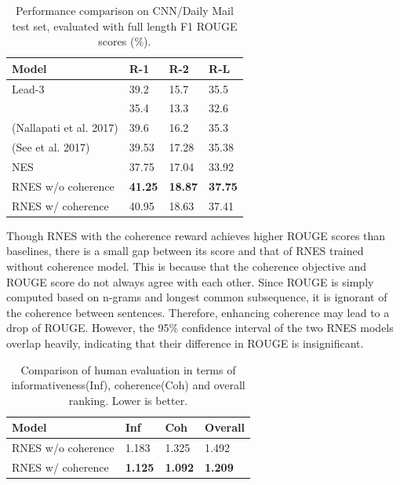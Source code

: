 \documentclass[letterpaper]{article} %
\begin{document}
	\vspace{-15pt}
	\begin{table}[ht]
		\centering
		\caption{Performance comparison on CNN/Daily Mail test set, evaluated with full length F1 ROUGE scores (\%).}
		\label{tab:rouge_cnn_dm}
		\begin{tabular}{|p{32mm}|p{12mm}|p{12mm}|p{11mm}|}
			\hline
			Model&R-1&R-2&R-L\\\hline
			Lead-3&39.2&15.7&35.5\\
			\cite{nallapati_ramesh_abstractive_2016}&35.4&13.3&32.6\\
			(Nallapati et al. 2017) &39.6&16.2&35.3\\
			(See et al. 2017)&39.53&17.28&35.38\\
			NES & 37.75 & 17.04 & 33.92\\\hline
			RNES w/o coherence&\textbf{41.25}&\textbf{18.87}&\textbf{37.75}\\
			RNES w/ coherence&40.95&18.63&37.41\\\hline
		\end{tabular}
	\end{table}
	\vspace{-5pt}

	Though RNES with the coherence reward achieves higher ROUGE scores than baselines, there is a small gap between its score and that of RNES trained without coherence model. This is because that the coherence objective and ROUGE score do not always agree with each other. Since ROUGE is simply computed based on n-grams and longest common subsequence, it is ignorant of the coherence between sentences. Therefore, enhancing coherence may lead to a drop of ROUGE. However, the 95\% confidence interval of the two RNES models overlap heavily, indicating that their difference in ROUGE is insignificant. 
	
	\vspace{-15pt}
	\begin{table}[ht]
	\centering
	\caption{Comparison of human evaluation in terms of informativeness(Inf), coherence(Coh) and overall ranking. Lower is better.}
	\label{tab:human_eval}
	
	\begin{tabular}{|p{31mm}|p{12mm}|p{12mm}|p{12mm}|}
		\hline
		Model&Inf&Coh&Overall\\\hline
		RNES w/o coherence&1.183&1.325&1.492 \\
		RNES w/ coherence& \textbf{1.125} & \textbf{1.092} & \textbf{1.209} \\\hline
	\end{tabular}
	\end{table}	
     \vspace{-5pt}
\end{document}
